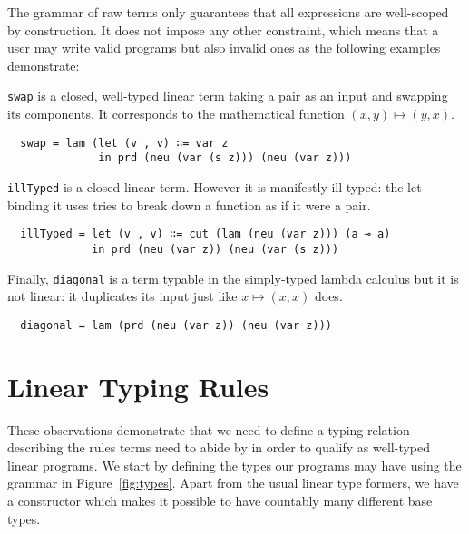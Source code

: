 \documentclass[a4paper,UKenglish]{lipics-v2016}
\begin{document}

The grammar of raw terms only guarantees that all expressions are
well-scoped by construction. It does not impose any other constraint,
which means that a user may write valid programs but also invalid
ones as the following examples demonstrate:

\begin{example}\label{example:swap}
\texttt{swap} is a closed, well-typed linear term taking a pair as
an input and swapping its components. It corresponds to the mathematical
function $(x, y) \mapsto (y, x)$.
\begin{lstlisting}
  swap = lam (let (v , v) ∷= var z
              in prd (neu (var (s z))) (neu (var z)))
\end{lstlisting}
\end{example}

\begin{example}\label{example:illTyped}
\texttt{illTyped} is a closed linear term. However it is manifestly
ill-typed: the let-binding it uses tries to break down a function as
if it were a pair.
\begin{lstlisting}
  illTyped = let (v , v) ∷= cut (lam (neu (var z))) (a ⊸ a)
             in prd (neu (var z)) (neu (var (s z)))
\end{lstlisting}
\end{example}

\begin{example}\label{example:diagonal}
Finally, \texttt{diagonal} is a term typable in the simply-typed
lambda calculus but it is not linear: it duplicates its input just
like $x \mapsto (x, x)$ does.
\begin{lstlisting}
  diagonal = lam (prd (neu (var z)) (neu (var z)))
\end{lstlisting}
\end{example}

\section{Linear Typing Rules}

These observations demonstrate that we need to define a typing
relation describing the rules terms need to abide by in order
to qualify as well-typed linear programs. We start by defining
the types our programs may have using the grammar in Figure~\ref{fig:types}.
Apart from the usual linear type formers, we have a constructor
\Base{} which makes it possible to have countably many different
base types.
\end{document}
